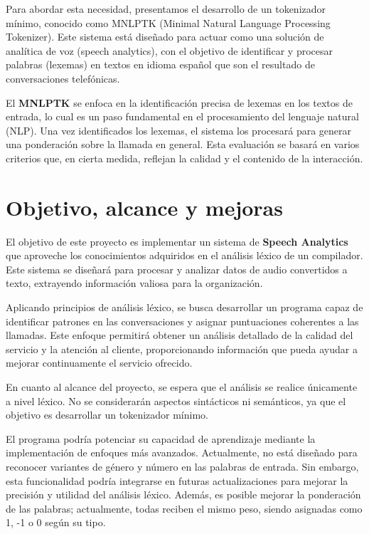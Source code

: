 \documentclass[10pt,times,twocolumn]{article}
\begin{document}
Para abordar esta necesidad, presentamos el desarrollo de un tokenizador mínimo, conocido como MNLPTK (Minimal Natural Language Processing Tokenizer). Este sistema está diseñado para actuar como una solución de analítica de voz (speech analytics), con el objetivo de identificar y procesar palabras (lexemas) en textos en idioma español que son el resultado de conversaciones telefónicas.

El \textbf{MNLPTK} se enfoca en la identificación precisa de lexemas en los textos de entrada, lo cual es un paso fundamental en el procesamiento del lenguaje natural (NLP). Una vez identificados los lexemas, el sistema los procesará para generar una ponderación sobre la llamada en general. 
Esta evaluación se basará en varios criterios que, en cierta medida, reflejan la calidad y el contenido de la interacción.

\section{Objetivo, alcance y mejoras}


El objetivo de este proyecto es implementar un sistema de \textbf{Speech Analytics} que aproveche los conocimientos adquiridos en el análisis léxico de un compilador. Este sistema se diseñará para procesar y analizar datos de audio convertidos a texto, extrayendo información valiosa para la organización.

Aplicando principios de análisis léxico, se busca desarrollar un programa capaz de identificar patrones en las conversaciones y asignar puntuaciones coherentes a las llamadas. Este enfoque permitirá obtener un análisis detallado de la calidad del servicio y la atención al cliente, proporcionando información que pueda ayudar a mejorar continuamente el servicio ofrecido.

En cuanto al alcance del proyecto, se espera que el análisis se realice únicamente a nivel léxico. No se considerarán aspectos sintácticos ni semánticos, ya que el objetivo es desarrollar un tokenizador mínimo.

El programa podría potenciar su capacidad de aprendizaje mediante la implementación de enfoques más avanzados. Actualmente, no está diseñado para reconocer variantes de género y número en las palabras de entrada. Sin embargo, esta funcionalidad podría integrarse en futuras actualizaciones para mejorar la precisión y utilidad del análisis léxico. Además, es posible mejorar la ponderación de las palabras; actualmente, todas reciben el mismo peso, siendo asignadas como 1, -1 o 0 según su tipo.
\end{document}
